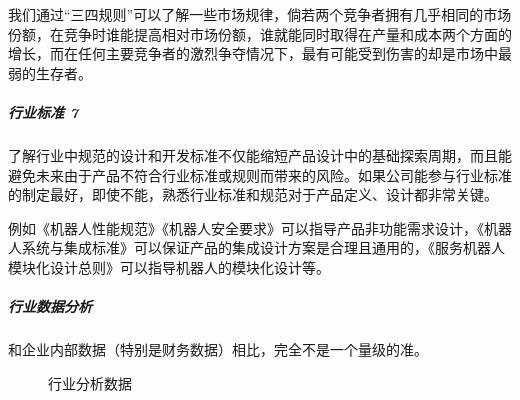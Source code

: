 \documentclass[letterpaper,10pt,english]{sphinxmanual}
\begin{document}
我们通过“三四规则”可以了解一些市场规律，倘若两个竞争者拥有几乎相同的市场份额，在竞争时谁能提高相对市场份额，谁就能同时取得在产量和成本两个方面的增长，而在任何主要竞争者的激烈争夺情况下，最有可能受到伤害的却是市场中最弱的生存者。


\subparagraph{行业标准 7\sphinxfootnotemark[509]}
\label{\detokenize{chapter_knowledge/industry_analysis:id17}}%
\begin{footnotetext}[509]\sphinxAtStartFootnote
{}
%
\end{footnotetext}\ignorespaces 
了解行业中规范的设计和开发标准不仅能缩短产品设计中的基础探索周期，而且能避免未来由于产品不符合行业标准或规则而带来的风险。如果公司能参与行业标准的制定最好，即使不能，熟悉行业标准和规范对于产品定义、设计都非常关键。

例如《机器人性能规范》《机器人安全要求》可以指导产品非功能需求设计，《机器人系统与集成标准》可以保证产品的集成设计方案是合理且通用的，《服务机器人模块化设计总则》可以指导机器人的模块化设计等。


\subparagraph{行业数据分析}
\label{\detokenize{chapter_knowledge/industry_analysis:id18}}
和企业内部数据（特别是财务数据）相比，完全不是一个量级的准。

\begin{figure}[H]
\centering
\capstart

\noindent{}
\caption{行业分析数据}\label{\detokenize{chapter_knowledge/industry_analysis:id29}}\end{figure}
\end{document}
